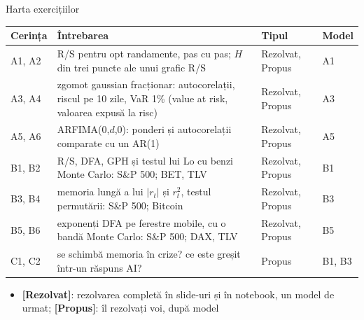\begin{frame}{Harta exercițiilor}
\itemsize{\small}
\begin{center}
\footnotesize
\begin{tabular}{>{\raggedright\arraybackslash}p{1.1cm}>{\raggedright\arraybackslash}p{7.5cm}>{\raggedright\arraybackslash}p{1.9cm}>{\raggedright\arraybackslash}p{1.4cm}}
\toprule
\textbf{Cerința} & \textbf{Întrebarea} & \textbf{Tipul} & \textbf{Model} \\
\midrule
A1, A2 & R/S pentru opt randamente, pas cu pas; $H$ din trei puncte ale unui grafic R/S & Rezolvat, Propus & A1 \\
A3, A4 & zgomot gaussian fracționar: autocorelații, riscul pe 10 zile, VaR 1\% (value at risk, valoarea expusă la risc) & Rezolvat, Propus & A3 \\
A5, A6 & ARFIMA(0,$d$,0): ponderi și autocorelații comparate cu un AR(1) & Rezolvat, Propus & A5 \\
B1, B2 & R/S, DFA, GPH și testul lui Lo cu benzi Monte Carlo: S\&P 500; BET, TLV & Rezolvat, Propus & B1 \\
B3, B4 & memoria lungă a lui $|r_t|$ și $r_t^2$, testul permutării: S\&P 500; Bitcoin & Rezolvat, Propus & B3 \\
B5, B6 & exponenți DFA pe ferestre mobile, cu o bandă Monte Carlo: S\&P 500; DAX, TLV & Rezolvat, Propus & B5 \\
C1, C2 & se schimbă memoria în crize? ce este greșit într-un răspuns AI? & Propus & B1, B3 \\
\bottomrule
\end{tabular}
\end{center}
\begin{itemize}
    \item \textbf{[Rezolvat]}: rezolvarea completă în slide-uri și în notebook, un model de urmat; \textbf{[Propus]}: îl rezolvați voi, după model
\end{itemize}
\end{frame}

